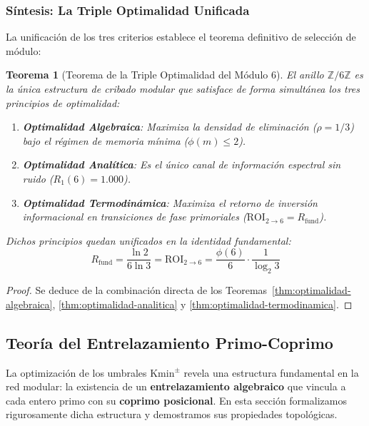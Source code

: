 \documentclass{article}
\numberwithin{equation}{section}
\theoremstyle{plain}
\newtheorem{theorem}{Teorema}[section]
\theoremstyle{definition}
\begin{document}
\subsubsection{Síntesis: La Triple Optimalidad Unificada}

La unificación de los tres criterios establece el teorema definitivo de selección de módulo:

\begin{theorem}[Teorema de la Triple Optimalidad del Módulo 6]
\label{thm:triple-optimalidad}
El anillo $\mathbb{Z}/6\mathbb{Z}$ es la única estructura de cribado modular que satisface de forma simultánea los tres principios de optimalidad:
\begin{enumerate}
    \item \textbf{Optimalidad Algebraica}: Maximiza la densidad de eliminación ($\rho = 1/3$) bajo el régimen de memoria mínima ($\phi(m) \le 2$).
    \item \textbf{Optimalidad Analítica}: Es el único canal de información espectral sin ruido ($R_1(6) = 1.000$).
    \item \textbf{Optimalidad Termodinámica}: Maximiza el retorno de inversión informacional en transiciones de fase primoriales ($\mathrm{ROI}_{2 \to 6} = R_{\text{fund}}$).
\end{enumerate}
Dichos principios quedan unificados en la identidad fundamental:
\begin{equation}
\boxed{
R_{\text{fund}} = \frac{\ln 2}{6\ln 3} = \mathrm{ROI}_{2\to6} = \frac{\phi(6)}{6} \cdot \frac{1}{\log_2 3}
}
\end{equation}
\end{theorem}

\begin{proof}
Se deduce de la combinación directa de los Teoremas~\ref{thm:optimalidad-algebraica}, \ref{thm:optimalidad-analitica} y \ref{thm:optimalidad-termodinamica}.
\end{proof}


\subsection{Teoría del Entrelazamiento Primo-Coprimo}
\label{sec:entrelazamiento}

La optimización de los umbrales $\mathrm{Kmin}^\pm$ revela una estructura fundamental en la red modular: la existencia de un \textbf{entrelazamiento algebraico} que vincula a cada entero primo con su \textbf{coprimo posicional}. En esta sección formalizamos rigurosamente dicha estructura y demostramos sus propiedades topológicas.
\end{document}

